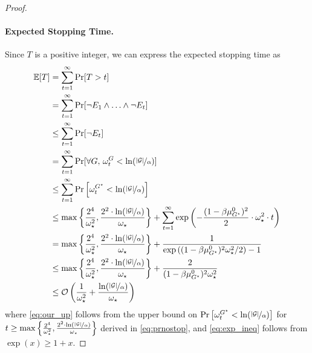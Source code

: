 \begin{proof}
\paragraph{Expected Stopping Time.} Since $T$ is a positive integer, we can express the expected stopping time as
\begin{align}
\mathbb{E}[T] &= \sum_{t=1}^\infty \Pr[T>t] \notag \\
&= \sum_{t=1}^\infty \Pr[\neg E_1 \land \ldots \land \neg E_t] \notag\\
&\leq \sum_{t=1}^\infty \Pr[\neg E_t] \notag\\
&= \sum_{t=1}^\infty \Pr[\forall G, \, \omega_t^G < \ln({\nicefrac{|{\mathcal{G}}|}{\alpha}})]\notag \\
&\leq \sum_{t=1}^\infty \Pr\left[\omega_t^{{G^\star}} < \ln({\nicefrac{|{\mathcal{G}}|}{\alpha}})\right] \notag\\
&\leq \max\bigg\{\frac{2^4}{\omega_\star^2}, \frac{2^2 \cdot \ln({\nicefrac{|{\mathcal{G}}|}{\alpha}})}{\omega_\star}\bigg\} + \sum_{t=1}^\infty \exp\left(- \frac{(1-\beta\mu_{G^\star}^0)^2}{2} \cdot \omega_\star^2 \cdot t \right) \label{eq:our_up}\\
&= \max\bigg\{\frac{2^4}{\omega_\star^2}, \frac{2^2 \cdot \ln({\nicefrac{|{\mathcal{G}}|}{\alpha}})}{\omega_\star}\bigg\} + \frac{1}{\exp{((1-\beta\mu_{G^\star}^0)^2 \omega_\star^2 /2)} - 1} \notag\\
&\leq \max\bigg\{\frac{2^4}{\omega_\star^2}, \frac{2^2 \cdot \ln({\nicefrac{|{\mathcal{G}}|}{\alpha}})}{\omega_\star}\bigg\} + \frac{2}{(1-\beta\mu_{G^\star}^0)^2 \omega_\star^2} \label{eq:exp_ineq}\\
&\leq \mathcal{O}\left(\frac{1}{\omega_\star^2} + \frac{\ln({\nicefrac{|{\mathcal{G}}|}{\alpha}})}{\omega_\star}\right) \notag
\end{align}
where \eqref{eq:our_up} follows from the upper bound on $\Pr\left[\omega_t^{{G^\star}} < \ln({\nicefrac{|{\mathcal{G}}|}{\alpha}})\right]$ for $t \geq \max\left\{\frac{2^4}{\omega_\star^2}, \frac{2^2 \cdot \ln({\nicefrac{|{\mathcal{G}}|}{\alpha}})}{\omega_\star}\right\}$ derived in \eqref{eq:prnostop}, and \eqref{eq:exp_ineq} follows from $\exp(x) \geq 1+x$. 
\end{proof}
